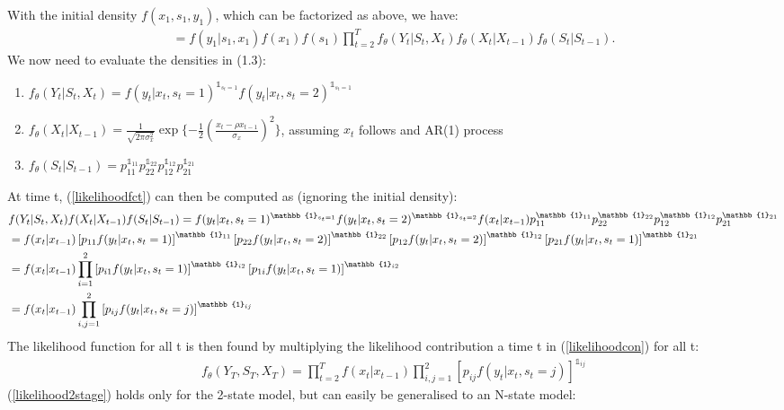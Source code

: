 \documentclass[11pt,a4paper,oneside]{article}
\newcommand{\rb}{\right]}
\newcommand{\lb}{\left[}
\begin{document}
With the initial density $f(x_1,s_1,y_1)$, which can be factorized as above, we have:
\begin{align}\label{likelihoodfct}
    =f(y_1\vert s_1,x_1)f(x_1)f(s_1)\prod_{t=2}^{T} f_\theta(Y_t\vert S_t,X_t)f_\theta(X_t\vert X_{t-1})f_\theta(S_t\vert S_{t-1}).
\end{align}
We now need to evaluate the densities in (1.3):
\begin{enumerate}
    \item $f_\theta(Y_t\vert S_t,X_t)=f(y_t\vert x_t,s_t=1)^{\mathbb{1}_{s_t=1}}f(y_t\vert x_t,s_t=2)^{\mathbb{1}_{s_t=1}}$
    \item $f_\theta(X_t\vert X_{t-1})=\frac{1}{\sqrt{2\pi\sigma_x^2}}\exp{\{-\frac{1}{2}(\frac{x_t-\rho x_{t-1}}{\sigma_x})^2\}}$, assuming $x_t$ follows and AR(1) process
    \item $f_\theta(S_t\vert S_{t-1})=p_{11}^{\mathbb{1}_{11}}p_{22}^{\mathbb{1}_{22}}p_{12}^{\mathbb{1}_{12}}p_{21}^{\mathbb{1}_{21}}$
\end{enumerate}
At time t, (\ref{likelihoodfct}) can then be computed as (ignoring the initial density): 
\begin{align}\label{likelihoodcon}
    &f(Y_t\vert S_t,X_t)f(X_t\vert X_{t-1})f(S_t\vert S_{t-1}) = f(y_t\vert x_t,s_t=1)^{\mathbb{1}_{s_t=1}}f(y_t\vert x_t,s_t=2)^{\mathbb{1}_{s_t=2}}f(x_t\vert x_{t-1})p_{11}^{\mathbb{1}_{11}}p_{22}^{\mathbb{1}_{22}}p_{12}^{\mathbb{1}_{12}}p_{21}^{\mathbb{1}_{21}} \notag \\ 
    &= f(x_t\vert x_{t-1}) \lb p_{11}f(y_t\vert x_t,s_t=1) \rb^{\mathbb{1}_{11}} \lb p_{22}f(y_t\vert x_t,s_t=2) \rb^{\mathbb{1}_{22}} \lb p_{12}f(y_t\vert x_t,s_t=2) \rb^{\mathbb{1}_{12}} \lb p_{21}f(y_t\vert x_t,s_t=1) \rb^{\mathbb{1}_{21}}  \notag \\
    &=f(x_t\vert x_{t-1})\prod_{i=1}^{2}\lb p_{i1}f(y_t\vert x_t,s_t=1) \rb^{\mathbb{1}_{i2}}\lb p_{1i}f(y_t\vert x_t,s_t=1) \rb^{\mathbb{1}_{i2}}  \notag \\
    &=f(x_t\vert x_{t-1})\prod_{i,j=1}^{2}\lb p_{ij}f(y_t\vert x_t,s_t=j) \rb^{\mathbb{1}_{ij}} 
\end{align}
The likelihood function for all t is then found by multiplying the likelihood contribution a time t in (\ref{likelihoodcon}) for all t: 
\begin{align}\label{likelihood2stage}
    f_\theta(Y_T,S_T,X_T)=\prod_{t=2}^{T}f(x_t\vert x_{t-1})\prod_{i,j=1}^{2}\lb p_{ij}f(y_t\vert x_t,s_t=j) \rb^{\mathbb{1}_{ij}}
\end{align}
(\ref{likelihood2stage}) holds only for the 2-state model, but can easily be generalised to an N-state model:
\end{document}
